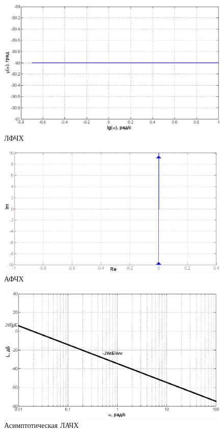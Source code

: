 \documentclass[12pt,a4paper]{article}
\begin{document}
\begin{figure}[H]
	\centering
	\includegraphics[width=1\linewidth]{LFCHH2.eps}
	\caption{ЛФЧХ}
\end{figure}
\begin{figure}[H]
	\centering
	\includegraphics[width=1\linewidth]{AFCHH2.eps}
	\caption{АФЧХ}
\end{figure}
\begin{figure}[H]
	\centering
	\includegraphics[width=1\linewidth]{L2.eps}
	\caption{Асимптотическая ЛАЧХ}
\end{figure}
\end{document}
